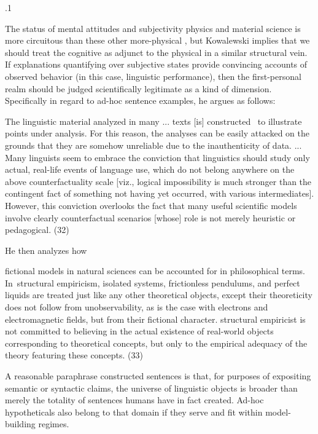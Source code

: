 \documentclass[11pt, twocolumn]{article}
\begin{document}
\p.1{%
\:\+The status of mental attitudes and subjectivity \visavis{} physics and material
science is more circuitous than these other more-physical ,
but Kowalewski implies that we should treat the cognitive as adjunct to the
physical in a similar structural vein. \>  If explanations quantifying
over subjective states provide convincing accounts of observed
behavior (in this case, linguistic performance), then the first-personal
realm should be judged scientifically legitimate as a kind of 
dimension. \>  Specifically in regard to ad-hoc sentence
examples, he argues as follows:   \> \upAdj{7pt}

\begin{blockQuote}
The linguistic material analyzed in many ... texts [is] constructed
\ellThree{2pt}{2pt}\ to illustrate points under analysis. \> 
For this reason, the analyses can be easily attacked on the grounds that
they are somehow unreliable due to the inauthenticity of data. \>  ...
Many linguists seem to embrace the conviction that linguistics should
study only actual, real-life events of language use, which do not belong anywhere on the above
counterfactuality scale [viz., logical impossibility is much stronger
than the contingent fact of something not having yet occurred, with
various intermediates]. \>  However, this conviction overlooks the fact
that many useful scientific models involve clearly counterfactual scenarios
[whose] role is not merely heuristic or pedagogical. (32)
\end{blockQuote}

\nip{}%
He then analyzes how\upAdj{9pt}

\begin{blockQuote}
fictional models in natural sciences can be accounted for in
philosophical terms. \>  In\hspace{-1pt}\ellThree{2pt}{2pt}\ structural empiricism, isolated
systems, frictionless pendulums, and perfect liquids are treated just like
any other theoretical objects, except their theoreticity does not follow from
unobservability, as is the case with electrons and electromagnetic fields, but
from their fictional character. \>  [A] structural empiricist is not
committed to believing in the actual existence of real-world objects corresponding
to theoretical concepts, but only to the empirical adequacy of the theory
featuring these concepts. \>  (33)
\end{blockQuote}

\nip{}%
A reasonable paraphrase \visavis{} constructed sentences is that, for purposes
of expositing semantic or syntactic claims, the universe of linguistic
objects is broader than merely the totality of sentences humans have in
fact created. \>  Ad-hoc hypotheticals also belong to that
domain if they serve and fit within model-building regimes.\<\;
}%
\end{document}
